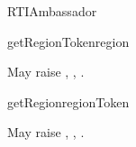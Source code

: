 \begin{classdesc}{RTIAmbassador}{}
\begin{methoddesc}[regionToken]{getRegionToken}{region}

May raise
,
,
.
\end{methoddesc}

\begin{methoddesc}[region]{getRegion}{regionToken}

May raise
,
,
.
\end{methoddesc}

\end{classdesc}

